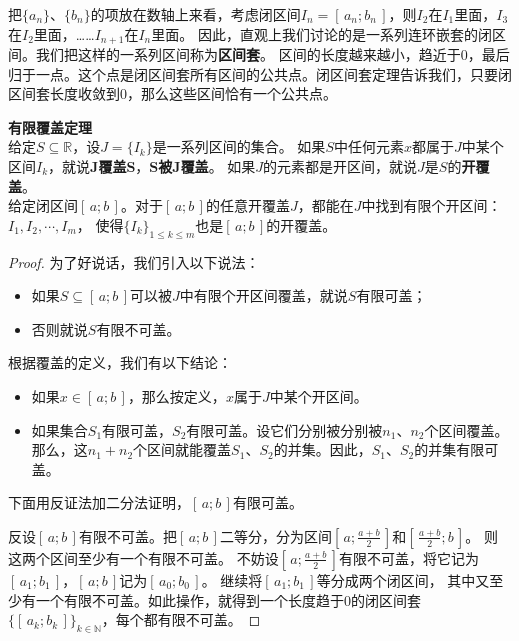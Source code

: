 \documentclass[12pt,UTF8]{ctexbook}
\begin{document}
\begin{appendix}
把$\{a_n\}$、$\{b_n\}$的项放在数轴上来看，考虑闭区间$I_n = [\,a_{n}; b_{n}\,]$，则$I_{2}$在$I_1$里面，$I_{3}$在$I_2$里面，……$I_{n+1}$在$I_n$里面。
因此，直观上我们讨论的是一系列连环嵌套的闭区间。我们把这样的一系列区间称为\textbf{区间套}。
区间的长度越来越小，趋近于$0$，最后归于一点。这个点是闭区间套所有区间的公共点。闭区间套定理告诉我们，只要闭区间套长度收敛到$0$，那么这些区间恰有一个公共点。

\begin{tm}\textbf{有限覆盖定理}\label{tm:a-2-50}\\
    给定$S\subseteq\mathbb{R}$，设$J = \{I_k\}$是一系列区间的集合。
    如果$S$中任何元素$x$都属于$J$中某个区间$I_k$，就说$\boldsymbol{J}$\textbf{覆盖}$\boldsymbol{S}$，$\boldsymbol{S}$\textbf{被}$\boldsymbol{J}$\textbf{覆盖}。
    如果$J$的元素都是开区间，就说$J$是$S$的\textbf{开覆盖}。\\    
    给定闭区间$[\,a; b\,]$。对于$[\,a; b\,]$的任意开覆盖$J$，都能在$J$中找到有限个开区间：$I_1, I_2, \cdots, I_m$，
    使得$\{I_k\}_{1\leqslant k\leqslant m}$也是$[\,a; b\,]$的开覆盖。
\end{tm}
\begin{proof}
    为了好说话，我们引入以下说法：
    \begin{itemize}
        \item 如果$S\subseteq[\,a; b\,]$可以被$J$中有限个开区间覆盖，就说$S$有限可盖；
        \item 否则就说$S$有限不可盖。
    \end{itemize}
    根据覆盖的定义，我们有以下结论：
    \begin{itemize}
        \item 如果$x\in[\,a; b\,]$，那么按定义，$x$属于$J$中某个开区间。
        \item 如果集合$S_1$有限可盖，$S_2$有限可盖。设它们分别被分别被$n_1$、$n_2$个区间覆盖。那么，这$n_1 + n_2$个区间就能覆盖$S_1$、$S_2$的并集。因此，$S_1$、$S_2$的并集有限可盖。
    \end{itemize}

    下面用反证法加二分法证明，$[\,a; b\,]$有限可盖。

    反设$[\,a; b\,]$有限不可盖。把$[\,a; b\,]$二等分，分为区间$\left[\,a; \frac{a+b}{2}\,\right]$和$\left[\,\frac{a+b}{2}; b\,\right]$。
    则这两个区间至少有一个有限不可盖。
    不妨设$\left[\,a; \frac{a+b}{2}\,\right]$有限不可盖，将它记为$[\,a_1; b_1\,]$，$[\,a; b\,]$记为$[\,a_0; b_0\,]$。
    继续将$[\,a_1; b_1\,]$等分成两个闭区间，
    其中又至少有一个有限不可盖。如此操作，就得到一个长度趋于$0$的闭区间套$\{[\,a_k; b_k\,]\}_{k\in\mathbb{N}}$，每个都有限不可盖。


\end{proof}
\end{appendix}
\end{document}
